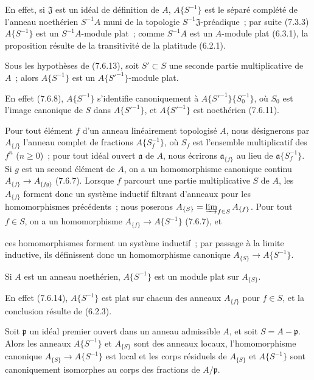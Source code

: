 En effet, si $\mathfrak J$ est un idéal de définition de $A$,
$A\{S^{-1}\}$ est le séparé complété de l'anneau noethérien $S^{-1}A$ muni
de la topologie $S^{-1}\mathfrak J$-préadique~; par suite (7.3.3)
$A\{S^{-1}\}$ est un $S^{-1}A$-module plat~; comme $S^{-1}A$ est un
$A$-module plat (6.3.1), la proposition résulte de la transitivité de la
platitude (6.2.1).

\begin{corollary}[7.6.14]
\label{0.7.6.14-fr}
Sous les hypothèses de (7.6.13), soit $S'\subset S$ une seconde partie
multiplicative de $A$~; alors $A\{S^{-1}\}$ est un
$A\{{S'}^{-1}\}$-module plat.
\end{corollary}

En effet (7.6.8), $A\{S^{-1}\}$ s'identifie canoniquement à
$A\{{S'}^{-1}\}\{S_0^{-1}\}$, où $S_0$ est l'image canonique de $S$ dans
$A\{{S'}^{-1}\}$, et $A\{{S'}^{-1}\}$ est noethérien (7.6.11).

\begin{env}[7.6.15]
\label{0.7.6.15-fr}
Pour tout élément $f$ d'un anneau linéairement topologisé $A$, nous
désignerons par $A_{\{f\}}$ l'anneau complet de fractions $A\{S_f^{-1}\}$,
où $S_f$ est l'ensemble multiplicatif des $f^n$ ($n\geq 0$)~; pour tout
idéal ouvert $\mathfrak a$ de $A$, nous écrirons $\mathfrak a_{\{f\}}$ au
lieu de $\mathfrak a\{S_f^{-1}\}$. Si $g$ est un second élément de $A$, on a
un homomorphisme canonique continu $A_{\{f\}}\to A_{\{fg\}}$ (7.6.7).
Lorsque $f$ parcourt une partie multiplicative $S$ de $A$, les $A_{\{f\}}$
forment donc un système inductif filtrant d'anneaux pour les homomorphismes
précédents~; nous poserons
$A_{\{S\}}=\varinjlim_{f\in S}A_{\{f\}}$. Pour tout $f\in S$, on a un
homomorphisme $A_{\{f\}}\to A\{S^{-1}\}$ (7.6.7), et


ces homomorphismes forment un système inductif~; par passage à la limite
inductive, ils définissent donc un homomorphisme canonique
$A_{\{S\}}\to A\{S^{-1}\}$.
\end{env}

\begin{proposition}[7.6.16]
\label{0.7.6.16-fr}
Si $A$ est un anneau noethérien, $A\{S^{-1}\}$ est un module plat sur
$A_{\{S\}}$.
\end{proposition}

En effet (7.6.14), $A\{S^{-1}\}$ est plat sur chacun des anneaux
$A_{\{f\}}$ pour $f\in S$, et la conclusion résulte de (6.2.3).

\begin{proposition}[7.6.17]
\label{0.7.6.17-fr}
Soit $\mathfrak p$ un idéal premier ouvert dans un anneau admissible $A$, et
soit $S=A-\mathfrak p$. Alors les anneaux $A\{S^{-1}\}$ et $A_{\{S\}}$ sont
des anneaux locaux, l'homomorphisme canonique
$A_{\{S\}}\to A\{S^{-1}\}$ est local et les corps résiduels de $A_{\{S\}}$
et $A\{S^{-1}\}$ sont canoniquement isomorphes au corps des fractions de
$A/\mathfrak p$.
\end{proposition}

